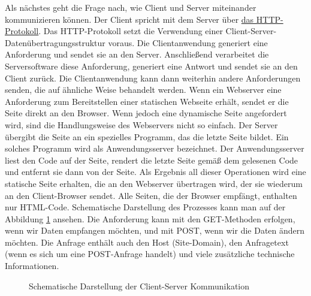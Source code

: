 Als nächstes geht die Frage nach, wie Client und Server miteinander kommunizieren können. Der Client spricht mit dem Server über \hyperref[sec:appendix:http]{das HTTP-Protokoll}. Das HTTP-Protokoll setzt die Verwendung einer Client-Server-Datenübertragungsstruktur voraus. Die Clientanwendung generiert eine Anforderung und sendet sie an den Server. Anschließend verarbeitet die Serversoftware diese Anforderung, generiert eine Antwort und sendet sie an den Client zurück. Die Clientanwendung kann dann weiterhin andere Anforderungen senden, die auf ähnliche Weise behandelt werden. Wenn ein Webserver eine Anforderung zum Bereitstellen einer statischen Webseite erhält, sendet er die Seite direkt an den Browser.\cite{website:2} Wenn jedoch eine dynamische Seite angefordert wird, sind die Handlungsweise des Webservers nicht so einfach. Der Server übergibt die Seite an ein spezielles Programm, das die letzte Seite bildet. Ein solches Programm wird als Anwendungsserver bezeichnet. Der Anwendungsserver liest den Code auf der Seite, rendert die letzte Seite gemäß dem gelesenen Code und entfernt sie dann von der Seite. Als Ergebnis all dieser Operationen wird eine statische Seite erhalten, die an den Webserver übertragen wird, der sie wiederum an den Client-Browser sendet. Alle Seiten, die der Browser empfängt, enthalten nur HTML-Code.\cite{website:2} Schematische Darstellung des Prozesses kann man auf der Abbildung \ref{fig:client-server}\cite{website:2} ansehen. Die Anforderung kann mit den GET-Methoden erfolgen, wenn wir Daten empfangen möchten, und mit POST, wenn wir die Daten ändern möchten. Die Anfrage enthält auch den Host (Site-Domain), den Anfragetext (wenn es sich um eine POST-Anfrage handelt) und viele zusätzliche technische Informationen. 
\begin{figure}
	\caption{Schematische Darstellung der Client-Server Kommunikation}
	\label{fig:client-server}
\end{figure}
